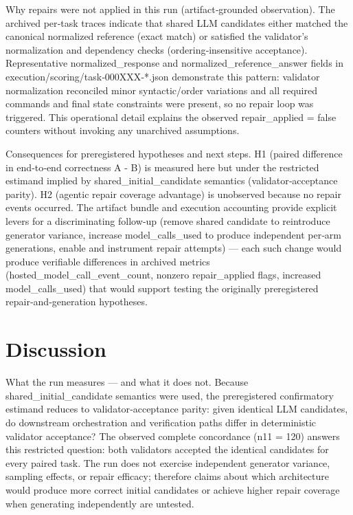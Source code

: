 \documentclass[conference]{IEEEtran}
\begin{document}
Why repairs were not applied in this run (artifact‑grounded observation). The archived per‑task traces indicate that shared LLM candidates either matched the canonical normalized reference (exact match) or satisfied the validator's normalization and dependency checks (ordering‑insensitive acceptance). Representative normalized\_response and normalized\_reference\_answer fields in execution/scoring/task‑000XXX‑*.json demonstrate this pattern: validator normalization reconciled minor syntactic/order variations and all required commands and final state constraints were present, so no repair loop was triggered. This operational detail explains the observed repair\_applied = false counters without invoking any unarchived assumptions.

Consequences for preregistered hypotheses and next steps. H1 (paired difference in end‑to‑end correctness A - B) is measured here but under the restricted estimand implied by shared\_initial\_candidate semantics (validator‑acceptance parity). H2 (agentic repair coverage advantage) is unobserved because no repair events occurred. The artifact bundle and execution accounting provide explicit levers for a discriminating follow‑up (remove shared candidate to reintroduce generator variance, increase model\_calls\_used to produce independent per‑arm generations, enable and instrument repair attempts) --- each such change would produce verifiable differences in archived metrics (hosted\_model\_call\_event\_count, nonzero repair\_applied flags, increased model\_calls\_used) that would support testing the originally preregistered repair‑and‑generation hypotheses.

\section{Discussion}
What the run measures --- and what it does not. Because shared\_initial\_candidate semantics were used, the preregistered confirmatory estimand reduces to validator‑acceptance parity: given identical LLM candidates, do downstream orchestration and verification paths differ in deterministic validator acceptance? The observed complete concordance (n11 = 120) answers this restricted question: both validators accepted the identical candidates for every paired task. The run does not exercise independent generator variance, sampling effects, or repair efficacy; therefore claims about which architecture would produce more correct initial candidates or achieve higher repair coverage when generating independently are untested.
\end{document}
